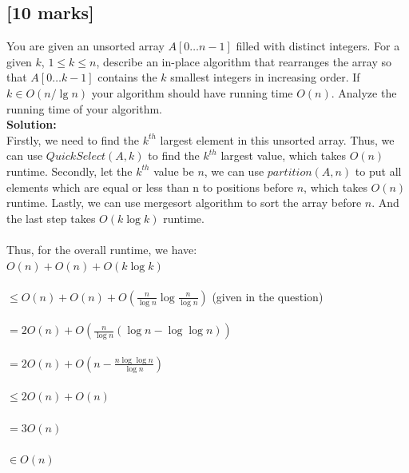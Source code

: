 \documentclass[12pt]{article}
\begin{document}
\subsection{[10 marks]}
You are given an unsorted array $A[0\ldots n-1]$ filled with
distinct integers. For a given $k$, $1\leq k\leq n$, describe an in-place
algorithm that rearranges the array so that $A[0\ldots k-1]$ contains
the $k$ smallest integers in increasing order.  If $k \in O(n/\lg n)$ 
your algorithm should have running time $O(n)$.  Analyze the running
time of your algorithm.
\\\textbf{Solution:}
\\Firstly, we need to find the $k^{th}$ largest element in this unsorted array. Thus, we can use $QuickSelect(A, k)$ to find the $k^{th}$ largest value, which takes $O(n)$ runtime. Secondly, let the $k^{th}$ value be $n$, we can use $partition(A, n)$ to put all elements which are equal or less than n to positions before $n$, which takes $O(n)$ runtime. Lastly, we can use mergesort algorithm to sort the array before $n$. And the last step takes $O(k\log{k})$ runtime.
\\
\\Thus, for the overall runtime, we have:
\\$O(n) + O(n) + O(k\log{k})$
\\
\\$\leq O(n) + O(n) + O(\frac{n}{\log{n}}\log{\frac{n}{\log{n}}})$ (given in the question)
\\
\\$= 2O(n) + O(\frac{n}{\log{n}}(\log{n} - \log{\log{n}})) $
\\
\\$=2O(n) + O(n - \frac{n\log{\log{n}}}{\log{n}})$
\\
\\$\leq 2O(n) + O(n)$
\\
\\$=3O(n)$
\\
\\$\in O(n)$
\end{document}
